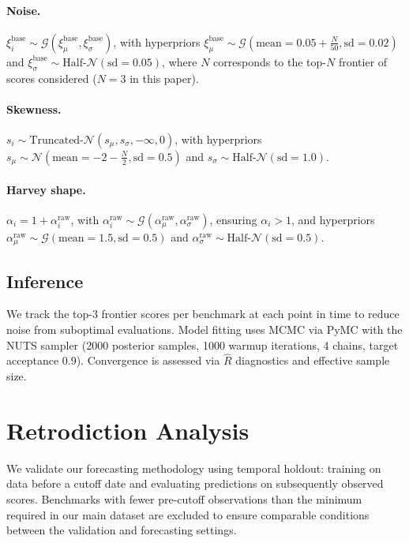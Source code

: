 \documentclass[letterpaper,twocolumn]{article}
\begin{document}
\paragraph{Noise.} $\xi_i^{\text{base}} \sim \mathcal G(\xi^{\text{base}}_{\mu}, \xi^{\text{base}}_{\sigma})$, with hyperpriors $\xi^{\text{base}}_{\mu} \sim \mathcal G(\text{mean} = 0.05 + \frac{N}{50}, \text{sd} = 0.02)$ and $\xi^{\text{base}}_{\sigma} \sim \text{Half-}\mathcal N(\text{sd}=0.05)$, where $N$ corresponds to the top-$N$ frontier of scores considered ($N=3$ in this paper).

\paragraph{Skewness.} $s_i \sim \text{Truncated-}\mathcal N(s_\mu, s_\sigma, -\infty, 0)$, with hyperpriors $s_\mu \sim \mathcal N(\text{mean} = -2 - \frac{N}{2}, \text{sd} = 0.5)$ and $s_\sigma \sim \text{Half-}\mathcal N(\text{sd}=1.0)$.

\paragraph{Harvey shape.} $\alpha_i = 1 + \alpha_i^{\text{raw}}$, with $\alpha_i^{\text{raw}} \sim \mathcal G(\alpha^{\text{raw}}_{\mu}, \alpha^{\text{raw}}_{\sigma})$, ensuring $\alpha_i > 1$, and hyperpriors $\alpha^{\text{raw}}_{\mu} \sim \mathcal G(\text{mean}=1.5, \text{sd}=0.5)$ and $\alpha^{\text{raw}}_{\sigma} \sim \text{Half-}\mathcal N(\text{sd}=0.5)$.

\subsection{Inference}

We track the top-3 frontier scores per benchmark at each point in time to reduce noise from suboptimal evaluations. Model fitting uses MCMC via PyMC \citep{abril-pla_pymc_2023} with the NUTS sampler (2000 posterior samples, 1000 warmup iterations, 4 chains, target acceptance 0.9). Convergence is assessed via $\hat{R}$ diagnostics and effective sample size.

\section{Retrodiction Analysis}
\label{app:retrodiction}

We validate our forecasting methodology using temporal holdout: training on data before a cutoff date and evaluating predictions on subsequently observed scores. Benchmarks with fewer pre-cutoff observations than the minimum required in our main dataset are excluded to ensure comparable conditions between the validation and forecasting settings.
\end{document}
